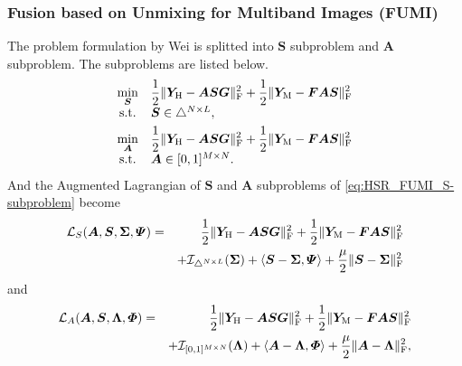 \subsubsection{Fusion based on Unmixing for Multiband Images (FUMI)}
The problem formulation by Wei \etal is splitted into $\bm S$ subproblem and
$\bm A$ subproblem.
The subproblems are listed below.
\begin{align}
    &
    \begin{array}{cl}
        \underset{\bm S}{\min} &
        \displaystyle
        \frac{1}{2} \Vert \bm Y_\text H - \bm A \bm S \bm G \Vert_\text F^2 +
        \frac{1}{2} \Vert \bm Y_\text M - \bm F \bm A \bm S \Vert_\text F^2 \\
        \text{s.t.} &
        \bm S \in \triangle^{N \times L},
    \end{array}
    \label{eq:HSR_FUMI_S-subproblem}
    \\
    &
    \begin{array}{cl}
        \underset{\bm A}{\min} &
        \displaystyle
        \frac{1}{2} \Vert \bm Y_\text H - \bm A \bm S \bm G \Vert_\text F^2 +
        \frac{1}{2} \Vert \bm Y_\text M - \bm F \bm A \bm S \Vert_\text F^2 \\
        \text{s.t.} &
        \bm A \in [0,1]^{M \times N}.
    \end{array}
    \label{eq:HSR_FUMI_A-subproblem}
\end{align}
And the Augmented Lagrangian of $\bm S$ and $\bm A$ subproblems of
\eqref{eq:HSR_FUMI_S-subproblem} become
\begin{eqnarray}
    \mathcal L_S(\bm A, \bm S, \bm \Sigma, \bm \varPsi)
    & = &
    \displaystyle
    \frac{1}{2} \Vert \bm Y_\text H - \bm A \bm S \bm G \Vert_\text F^2 +
    \frac{1}{2} \Vert \bm Y_\text M - \bm F \bm A \bm S \Vert_\text F^2 \nonumber \\
    &   &
    + \mathcal I_{\triangle^{N \times L}}(\bm \Sigma) +
    \langle \bm S - \bm \Sigma , \bm \varPsi \rangle +
    \displaystyle \frac{\mu}{2} \Vert \bm S - \bm \Sigma \Vert_\text F^2
    \label{eq:HSR_FUMI_Lagragian_S-subproblem}
\end{eqnarray}
and
\begin{eqnarray}
    \mathcal L_A(\bm A, \bm S, \bm \Lambda, \bm \varPhi)
    & = &
    \displaystyle
    \frac{1}{2} \Vert \bm Y_\text H - \bm A \bm S \bm G \Vert_\text F^2 +
    \frac{1}{2} \Vert \bm Y_\text M - \bm F \bm A \bm S \Vert_\text F^2 \nonumber \\
    &   &
    + \mathcal I_{[0,1]^{M \times N}}(\bm \Lambda) +
    \langle \bm A - \bm \Lambda , \bm \varPhi \rangle +
    \displaystyle \frac{\mu}{2} \Vert \bm A - \bm \Lambda \Vert_\text F^2,
    \label{eq:HSR_FUMI_Lagrangian_A_subproblem}
\end{eqnarray}
